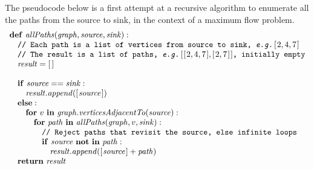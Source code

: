 \documentclass[10pt,a4paper]{exam}
\begin{document}
\begin{questions}
\question The pseudocode below is a first attempt at a recursive algorithm to enumerate all the paths from the source to sink, in the context of a maximum flow problem.
\begin{displaymath}
\begin{array}{l}
\mathbf{def}~\mathit{allPaths}(\mathit{graph}, \mathit{source}, \mathit{sink}): \\
\quad \texttt{// Each path is a list of vertices from source to sink, \emph{e.g.}$\hslist{2,4,7}$} \\
\quad \texttt{// The result is a list of paths, \emph{e.g.}$\hslist{\hslist{2,4,7}, \hslist{2,7}}$, initially empty} \\
\quad \mathit{result} = \hslist{} \\\\
\quad \mathbf{if}~\mathit{source} == \mathit{sink}: \\
\quad \quad \mathit{result}.\mathit{append}(\hslist{\mathit{source}}) \\
\quad \mathbf{else}:\\
\quad \quad \mathbf{for}~v~\mathbf{in}~\mathit{graph}.\mathit{verticesAdjacentTo}(\mathit{source}): \\
\quad \quad \quad \mathbf{for}~\mathit{path}~\mathbf{in}~\mathit{allPaths}(\mathit{graph},v,\mathit{sink}):\\
\quad \quad \quad \quad \texttt{// Reject paths that revisit the source, else infinite loops} \\
\quad \quad \quad \quad \mathbf{if}~\mathit{source}~\mathbf{not}~\mathbf{in}~\mathit{path}: \\
\quad \quad \quad \quad \quad \mathit{result}.\mathit{append}(\hslist{\mathit{source}} + \mathit{path}) \\
\quad \mathbf{return}~\mathit{result}
\end{array}
\end{displaymath}

\end{questions}
\end{document}
